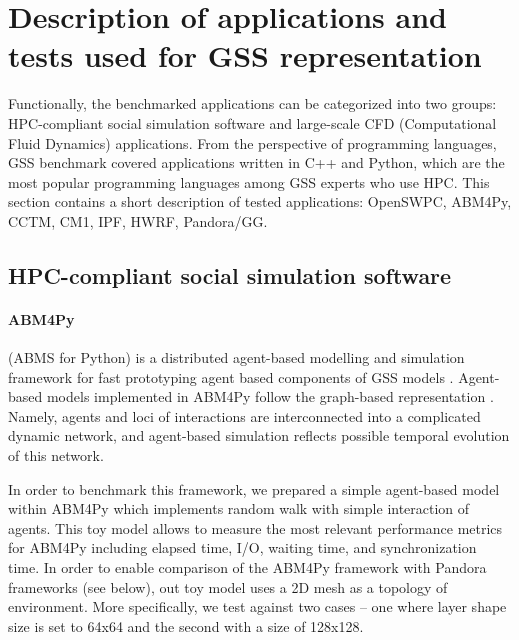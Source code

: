 \section{Description of applications and tests used for GSS representation}
Functionally, the  benchmarked  applications  can  be  categorized  into  two  groups: HPC-compliant social simulation software and large-scale CFD (Computational Fluid Dynamics) applications. From the perspective of programming languages, GSS benchmark covered applications written in C++ and Python, which are the most popular programming languages among GSS experts who use HPC.
This section contains a short description of tested applications: OpenSWPC, ABM4Py, CCTM, CM1, IPF, HWRF, Pandora/GG.

\subsection{HPC-compliant social simulation software}

\paragraph{ABM4Py} (ABMS for Python) is a distributed agent-based modelling and simulation framework for fast prototyping agent based components of GSS models \cite{2018:abm4py}.
Agent-based models implemented in \textsf{ABM4Py} follow the graph-based representation \cite{2018:abm4py,2017:graph_abms}.
Namely, agents and loci of interactions are interconnected into a complicated dynamic network, and agent-based simulation reflects possible temporal evolution of this network.

In order to benchmark this framework, we prepared a simple agent-based model within \textsf{ABM4Py} which implements random walk with simple interaction of agents.
This toy model allows to measure the most relevant performance metrics for \textsf{ABM4Py} including elapsed time, I/O, waiting time, and synchronization time.
In order to enable comparison of the \textsf{ABM4Py} framework with \textsf{Pandora} frameworks (see below), out toy model uses a 2D mesh as a topology of environment.
More specifically, we test against two cases -- one where layer shape size is set to 64x64 and the second with a size of 128x128.

